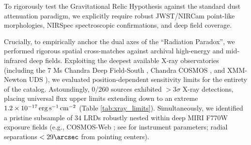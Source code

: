 \documentclass[twocolumn]{aastex631}
\begin{document}
To rigorously test the Gravitational Relic Hypothesis against the standard dust attenuation paradigm, we explicitly require robust JWST/NIRCam point-like morphologies, NIRSpec spectroscopic confirmations, and deep field coverage. 

Crucially, to empirically anchor the dual axes of the ``Radiation Paradox'', we performed rigorous spatial cross-matches against archival high-energy and mid-infrared deep fields. Exploiting the deepest available X-ray observatories (including the 7 Ms Chandra Deep Field-South \citep{Luo2017}, Chandra COSMOS \citep{Civano2016}, and XMM-Newton UDS \citep{Ranalli2015}), we evaluated position-dependent sensitivity limits for the entirety of the catalog. Astoundingly, 0/260 sources exhibited $>3\sigma$ X-ray detections, placing universal flux upper limits extending down to an extreme $1.2 \times 10^{-17} \rm\,erg\,s^{-1}\,cm^{-2}$ (Table \ref{tab:xray_limits}). Simultaneously, we identified a pristine subsample of 34 LRDs robustly nested within deep MIRI F770W exposure fields (e.g., COSMOS-Web \citep{Casey2023}; see \citealt{Rieke2023} for instrument parameters; radial separations $< 29\arcsec$ from pointing centers). 
\end{document}

